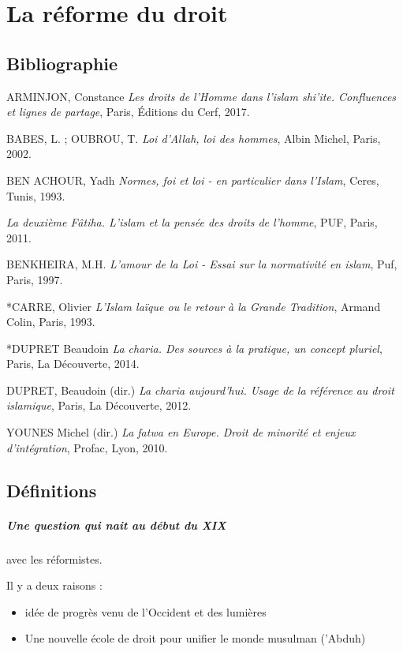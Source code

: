 \chapter{La réforme du droit}


\section{Bibliographie}

 
ARMINJON, Constance \emph{Les droits de l'Homme dans l'islam shi'ite.
Confluences et lignes de partage}, Paris, Éditions du Cerf, 2017.

BABES, L. ; OUBROU, T. \emph{Loi d'Allah, loi des hommes}, Albin Michel,
Paris, 2002.

BEN ACHOUR, Yadh \emph{Normes, foi et loi - en particulier dans
l'Islam}, Ceres, Tunis, 1993.

\emph{La deuxième Fâtiha. L'islam et la pensée des droits de l'homme},
PUF, Paris, 2011.

BENKHEIRA, M.H. \emph{L'amour de la Loi - Essai sur la normativité en
islam}, Puf, Paris, 1997.

*CARRE, Olivier \emph{L'Islam laïque ou le retour à la Grande
Tradition}, Armand Colin, Paris, 1993.

*DUPRET Beaudoin \emph{La charia. Des sources à la pratique, un concept
pluriel}, Paris, La Découverte, 2014.

DUPRET, Beaudoin (dir.) \emph{La charia aujourd'hui. Usage de la
référence au droit islamique}, Paris, La Découverte, 2012.

YOUNES Michel (dir.) \emph{La fatwa en Europe. Droit de minorité et
enjeux d'intégration}, Profac, Lyon, 2010.
 


\section{Définitions}


\paragraph{Une question qui nait au début du XIX} avec les réformistes. 
\begin{Synthesis}
Il y a deux raisons : 
\begin{itemize}
    \item idée de progrès venu de l'Occident et des lumières
    \item Une nouvelle école de droit pour unifier le monde musulman ('Abduh)
\end{itemize}
\end{Synthesis}
    
